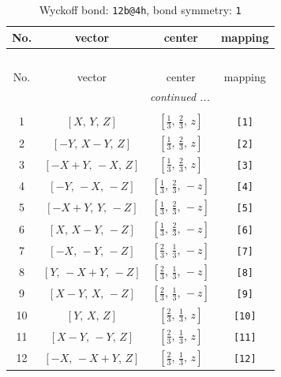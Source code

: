 \documentclass[fleqn,8pt]{jsarticle}
\begin{document}
\begin{longtable}{cccc}
\caption{Wyckoff bond: {\tt 12b@4h}, bond symmetry: {\tt 1}}
 \\
 \hline \hline
No. & vector & center & mapping \\ \hline \endfirsthead

\multicolumn{3}{l}{\tablename\ \thetable{}} \\
 \hline \hline
No. & vector & center & mapping \\ \hline \endhead

 \hline \hline
\multicolumn{3}{r}{\footnotesize\it continued ...} \\ \endfoot

 \hline \hline
\multicolumn{3}{r}{} \\ \endlastfoot

1 & $\left[ X,\, Y,\, Z \right]$ & $\left[ \frac{1}{3},\, \frac{2}{3},\, z \right]$ & {\tt [1]} \\ \hline
2 & $\left[ - Y,\, X - Y,\, Z \right]$ & $\left[ \frac{1}{3},\, \frac{2}{3},\, z \right]$ & {\tt [2]} \\ \hline
3 & $\left[ - X + Y,\, - X,\, Z \right]$ & $\left[ \frac{1}{3},\, \frac{2}{3},\, z \right]$ & {\tt [3]} \\ \hline
4 & $\left[ - Y,\, - X,\, - Z \right]$ & $\left[ \frac{1}{3},\, \frac{2}{3},\, - z \right]$ & {\tt [4]} \\ \hline
5 & $\left[ - X + Y,\, Y,\, - Z \right]$ & $\left[ \frac{1}{3},\, \frac{2}{3},\, - z \right]$ & {\tt [5]} \\ \hline
6 & $\left[ X,\, X - Y,\, - Z \right]$ & $\left[ \frac{1}{3},\, \frac{2}{3},\, - z \right]$ & {\tt [6]} \\ \hline
7 & $\left[ - X,\, - Y,\, - Z \right]$ & $\left[ \frac{2}{3},\, \frac{1}{3},\, - z \right]$ & {\tt [7]} \\ \hline
8 & $\left[ Y,\, - X + Y,\, - Z \right]$ & $\left[ \frac{2}{3},\, \frac{1}{3},\, - z \right]$ & {\tt [8]} \\ \hline
9 & $\left[ X - Y,\, X,\, - Z \right]$ & $\left[ \frac{2}{3},\, \frac{1}{3},\, - z \right]$ & {\tt [9]} \\ \hline
10 & $\left[ Y,\, X,\, Z \right]$ & $\left[ \frac{2}{3},\, \frac{1}{3},\, z \right]$ & {\tt [10]} \\ \hline
11 & $\left[ X - Y,\, - Y,\, Z \right]$ & $\left[ \frac{2}{3},\, \frac{1}{3},\, z \right]$ & {\tt [11]} \\ \hline
12 & $\left[ - X,\, - X + Y,\, Z \right]$ & $\left[ \frac{2}{3},\, \frac{1}{3},\, z \right]$ & {\tt [12]} \\
\end{longtable}
\end{document}
